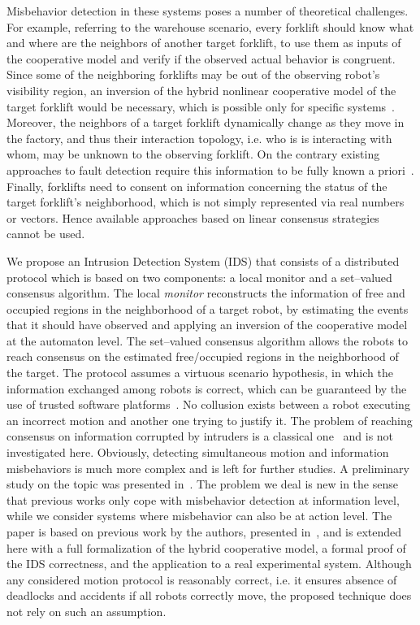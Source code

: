 \documentclass[journal, onecolumn, 12pt]{styles/IEEEtran}
\begin{document}
Misbehavior detection in these systems poses a number of theoretical challenges. For example, referring to the warehouse scenario, every forklift should know what and where are the neighbors of another target forklift, to use them as inputs of the cooperative model and verify if the observed actual behavior is congruent. Since some of the neighboring forklifts may be out of the observing robot's visibility region, an inversion of the hybrid nonlinear cooperative model of the target forklift would be necessary, which is possible only for specific systems~\cite{sain2002invertibility, vu2008invertibility, millerioux2007invertibility}. Moreover, the neighbors of a target forklift dynamically change as they move in the factory, and thus their interaction topology, i.e. who is is interacting with whom, may be unknown to the observing forklift. On the contrary existing approaches to fault detection require this information to be fully known a priori~\cite{RamadgeWonham, yoo-lafortune:02, ozveren:92, fourlas:2002}. Finally, forklifts need to consent on information concerning the status of the target forklift's neighborhood, which is not simply represented via real numbers or vectors. Hence available approaches based on linear consensus strategies~\cite{jadbabaie2003cgm, ieee07-murray} cannot be used. 

We propose an Intrusion Detection System (IDS) that consists of a distributed  protocol which is based on two components: a local monitor and a set--valued consensus algorithm. The local {\em monitor} reconstructs the information of free and occupied regions in the neighborhood of a target robot, by estimating the events that it should have observed and applying an inversion of the cooperative model at the automaton level. The set--valued consensus algorithm allows the robots to reach consensus on the estimated free/occupied regions in the neighborhood of the target. The protocol assumes a virtuous scenario hypothesis, in which the information exchanged among robots is correct, which can be guaranteed by the use of trusted software platforms~\cite{england2003trusted}. No collusion exists between a robot executing an incorrect motion and another one trying to justify it. The problem of reaching consensus on information corrupted by intruders is a classical one~\cite{lamport82} and is not investigated here. Obviously, detecting simultaneous motion and information misbehaviors is much more complex and is left for further studies. A preliminary study on the topic was presented in~\cite{ssrr08-fagiolini}. The problem we deal is new in the sense that previous works only cope with misbehavior detection at information level, while we consider systems where misbehavior can also be at action level. The paper is based on previous work by the authors, presented in~\cite{cdc07-fagiolini, icra08-fagiolini}, and is extended here with a full formalization of the hybrid cooperative model, a formal proof of the IDS correctness, and the application to a real experimental system. Although any considered motion protocol is reasonably correct, i.e. it ensures absence of deadlocks and accidents if all robots correctly move, the proposed technique does not rely on such an assumption.
\end{document}

